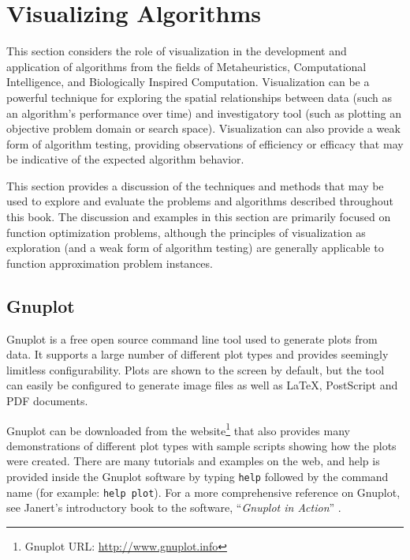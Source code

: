 
\section{Visualizing Algorithms}
\label{advanced:sec:visualizing_algorithms}

This section considers the role of visualization in the development and application of algorithms from the fields of Metaheuristics, Computational Intelligence, and Biologically Inspired Computation.
Visualization can be a powerful technique for exploring the spatial relationships between data (such as an algorithm's performance over time) and investigatory tool (such as plotting an objective problem domain or search space). Visualization can also provide a weak form of algorithm testing, providing observations of efficiency or efficacy that may be indicative of the expected algorithm behavior.

This section provides a discussion of the techniques and methods that may be used to explore and evaluate the problems and algorithms described throughout this book.
The discussion and examples in this section are primarily focused on function optimization problems, although the principles of visualization as exploration (and a weak form of algorithm testing) are generally applicable to function approximation problem instances.

%
%
\subsection{Gnuplot}
Gnuplot is a free open source command line tool used to generate plots from data. It supports a large number of different plot types and provides seemingly limitless configurability. Plots are shown to the screen by default, but the tool can easily be configured to generate image files as well as \LaTeX, PostScript and PDF documents.

Gnuplot can be downloaded from the website\footnote{Gnuplot URL: \url{http://www.gnuplot.info}} that also provides many demonstrations of different plot types with sample scripts showing how the plots were created. There are many tutorials and examples on the web, and help is provided inside the Gnuplot software by typing \texttt{help} followed by the command name (for example: \texttt{help plot}). For a more comprehensive reference on Gnuplot, see Janert's introductory book to the software, ``\emph{Gnuplot in Action}'' \cite{Janert2009}.

